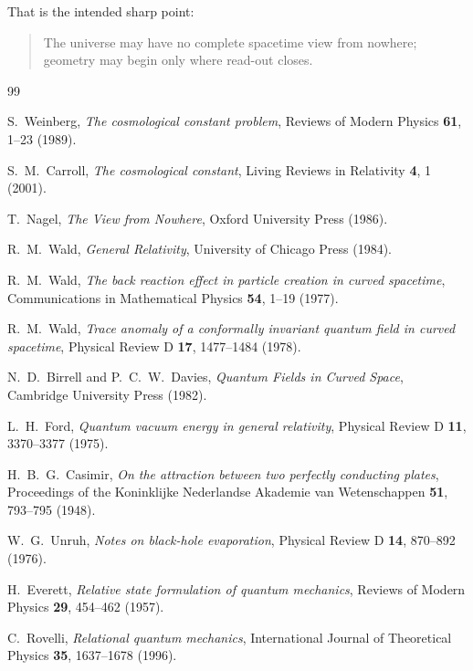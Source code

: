 \documentclass[12pt,a4paper]{article}
\theoremstyle{definition}
\theoremstyle{remark}
\begin{document}
That is the intended sharp point:

\begin{quote}
The universe may have no complete spacetime view from nowhere; geometry may begin only where read-out closes.
\end{quote}

\begin{thebibliography}{99}

S.~Weinberg, \emph{The cosmological constant problem}, Reviews of Modern Physics \textbf{61}, 1--23 (1989).

S.~M.~Carroll, \emph{The cosmological constant}, Living Reviews in Relativity \textbf{4}, 1 (2001).

T.~Nagel, \emph{The View from Nowhere}, Oxford University Press (1986).

R.~M.~Wald, \emph{General Relativity}, University of Chicago Press (1984).

R.~M.~Wald, \emph{The back reaction effect in particle creation in curved spacetime}, Communications in Mathematical Physics \textbf{54}, 1--19 (1977).

R.~M.~Wald, \emph{Trace anomaly of a conformally invariant quantum field in curved spacetime}, Physical Review D \textbf{17}, 1477--1484 (1978).

N.~D.~Birrell and P.~C.~W.~Davies, \emph{Quantum Fields in Curved Space}, Cambridge University Press (1982).

L.~H.~Ford, \emph{Quantum vacuum energy in general relativity}, Physical Review D \textbf{11}, 3370--3377 (1975).

H.~B.~G.~Casimir, \emph{On the attraction between two perfectly conducting plates}, Proceedings of the Koninklijke Nederlandse Akademie van Wetenschappen \textbf{51}, 793--795 (1948).

W.~G.~Unruh, \emph{Notes on black-hole evaporation}, Physical Review D \textbf{14}, 870--892 (1976).

H.~Everett, \emph{Relative state formulation of quantum mechanics}, Reviews of Modern Physics \textbf{29}, 454--462 (1957).

C.~Rovelli, \emph{Relational quantum mechanics}, International Journal of Theoretical Physics \textbf{35}, 1637--1678 (1996).


\end{thebibliography}
\end{document}
